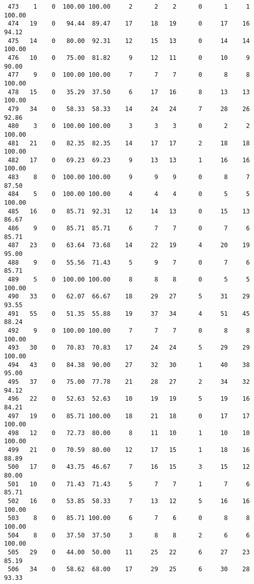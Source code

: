 \begin{verbatim}
 473    1    0  100.00 100.00     2      2    2      0      1     1   100.00
 474   19    0   94.44  89.47    17     18   19      0     17    16    94.12
 475   14    0   80.00  92.31    12     15   13      0     14    14   100.00
 476   10    0   75.00  81.82     9     12   11      0     10     9    90.00
 477    9    0  100.00 100.00     7      7    7      0      8     8   100.00
 478   15    0   35.29  37.50     6     17   16      8     13    13   100.00
 479   34    0   58.33  58.33    14     24   24      7     28    26    92.86
 480    3    0  100.00 100.00     3      3    3      0      2     2   100.00
 481   21    0   82.35  82.35    14     17   17      2     18    18   100.00
 482   17    0   69.23  69.23     9     13   13      1     16    16   100.00
 483    8    0  100.00 100.00     9      9    9      0      8     7    87.50
 484    5    0  100.00 100.00     4      4    4      0      5     5   100.00
 485   16    0   85.71  92.31    12     14   13      0     15    13    86.67
 486    9    0   85.71  85.71     6      7    7      0      7     6    85.71
 487   23    0   63.64  73.68    14     22   19      4     20    19    95.00
 488    9    0   55.56  71.43     5      9    7      0      7     6    85.71
 489    5    0  100.00 100.00     8      8    8      0      5     5   100.00
 490   33    0   62.07  66.67    18     29   27      5     31    29    93.55
 491   55    0   51.35  55.88    19     37   34      4     51    45    88.24
 492    9    0  100.00 100.00     7      7    7      0      8     8   100.00
 493   30    0   70.83  70.83    17     24   24      5     29    29   100.00
 494   43    0   84.38  90.00    27     32   30      1     40    38    95.00
 495   37    0   75.00  77.78    21     28   27      2     34    32    94.12
 496   22    0   52.63  52.63    10     19   19      5     19    16    84.21
 497   19    0   85.71 100.00    18     21   18      0     17    17   100.00
 498   12    0   72.73  80.00     8     11   10      1     10    10   100.00
 499   21    0   70.59  80.00    12     17   15      1     18    16    88.89
 500   17    0   43.75  46.67     7     16   15      3     15    12    80.00
 501   10    0   71.43  71.43     5      7    7      1      7     6    85.71
 502   16    0   53.85  58.33     7     13   12      5     16    16   100.00
 503    8    0   85.71 100.00     6      7    6      0      8     8   100.00
 504    8    0   37.50  37.50     3      8    8      2      6     6   100.00
 505   29    0   44.00  50.00    11     25   22      6     27    23    85.19
 506   34    0   58.62  68.00    17     29   25      6     30    28    93.33

\end{verbatim}
